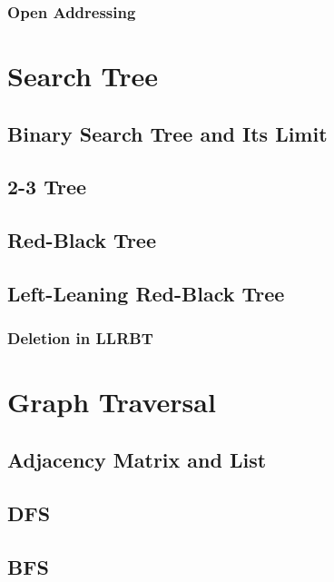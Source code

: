 \documentclass{report}
\begin{document}
\subsection{Open Addressing}


\chapter{Search Tree}

\section{Binary Search Tree and Its Limit}

\section{2-3 Tree}

\section{Red-Black Tree}

\section{Left-Leaning Red-Black Tree}

\subsection{Deletion in LLRBT}


\chapter{Graph Traversal}

\section{Adjacency Matrix and List}

\section{DFS}

\section{BFS}
\end{document}
